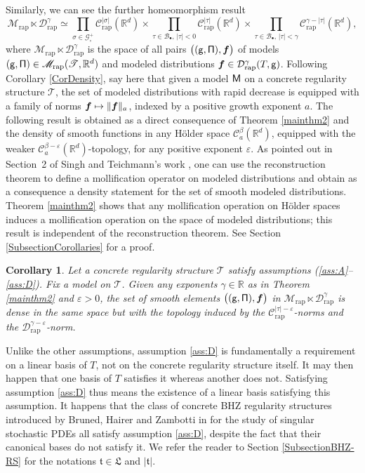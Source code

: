 \documentclass[10pt]{amsart}
\newcommand\mto{\mathchoice{\longmapsto}{\mapsto}{\mapsto}{\mapsto}}
\newcommand{\sbullet}{{\scriptscriptstyle\bullet}}
\theoremstyle{plain}
\newtheorem{cor}[thm]{Corollary}
\theoremstyle{definition}
\newcommand{\bsf}{\boldsymbol{f}}
\newcommand{\rap}{\mathrm{rap}}
\newcommand{\scrM}{\mathscr{M}}
\newcommand{\scrT}{\mathscr{T}}
\let\epsilon\varepsilon
\newcommand{\bbR}{\mathbb{R}}
\newcommand{\mcB}{\mathcal{B}}
\newcommand{\mcC}{\mathcal{C}}
\newcommand{\mcD}{\mathcal{D}}
\newcommand{\mcG}{\mathcal{G}}
\begin{document}
Similarly, we can see the further homeomorphism result
\[
\scrM_{\rap}\ltimes\mcD_{\rap}^\gamma \simeq
\prod_{\sigma\in\mcG_\circ^+} \mcC_\rap^{|\sigma|}(\bbR^d) \times \prod_{\tau\in\mcB_\sbullet,\,|\tau|<0} \mcC_\rap^{|\tau|}(\bbR^d)
\times \prod_{\tau\in\mcB_\sbullet,\, |\tau|<\gamma} \mcC_\rap^{\gamma-|\tau|}(\bbR^d),
\]
where $\scrM_{\rap}\ltimes\mcD_{\rap}^\gamma$ is the space of all pairs $\bigl(({\sf g},{\sf\Pi}),\bsf\bigr)$ of models $({\sf g},{\sf\Pi})\in\scrM_{\rap}(\scrT,\bbR^d)$ and modeled distributions $\bsf\in\mcD_{\rap}^\gamma(T,{\sf g})$. Following Corollary \ref{CorDensity}, say here that given a model $\sf M$ on a concrete regularity structure $\mathscr{T}$, the set of modeled distributions with rapid decrease is equipped with a family of norms $\bsf \mto \|\bsf\|_a$, indexed by a positive growth exponent $a$. The following result is obtained as a direct consequence of Theorem \ref{mainthm2} and the density of smooth functions in any Hölder space $\mcC_a^\beta(\bbR^d)$, equipped with the weaker $\mcC_a^{\beta-\epsilon}(\bbR^d)$-topology, for any positive exponent $\epsilon$. As pointed out in Section~2 of Singh and Teichmann's work \cite{SinghTeichmann}, one can use the reconstruction theorem to define a mollification operator on modeled distributions and obtain as a consequence a density statement for the set of smooth modeled distributions. Theorem \ref{mainthm2} shows that any mollification operation on Hölder spaces induces a mollification operation on the space of modeled distributions; this result is independent of the reconstruction theorem. See Section \ref{SubsectionCorollaries} for a proof.

\begin{cor} \label{CorDensitySmoothModelled}
Let a concrete regularity structure $\scrT$ satisfy assumptions \textup{(\ref{ass:A}--\ref{ass:D})}. Fix a model on $\mathscr{T}$. Given any exponents $\gamma\in\bbR$ as in Theorem \ref{mainthm2} and $\epsilon>0$, the set of smooth elements $\bigl(({\sf g},{\sf\Pi}),\bsf\bigr)$ in $\scrM_{\rap}\ltimes\mcD_{\rap}^\gamma$ is dense in the same space but with the topology induced by the $\mcC_{\rap}^{|\tau|-\epsilon}$-norms and the $\mcD_{\rap}^{\gamma-\epsilon}$-norm.
\end{cor}

Unlike the other assumptions, assumption \eqref{ass:D} is fundamentally a requirement on a linear basis of $T$, not on the concrete regularity structure itself. It may then happen that one basis of $T$ satisfies it whereas another does not. Satisfying assumption \eqref{ass:D} thus means the existence of a linear basis satisfying this assumption. It happens that the class of concrete BHZ regularity structures introduced by Bruned, Hairer and Zambotti in \cite{BHZ} for the study of singular stochastic PDEs all satisfy assumption \eqref{ass:D}, despite the fact that their canonical bases do not satisfy it. We refer the reader to Section \ref{SubsectionBHZ-RS} for the notations $\mathfrak{t}\in\mathfrak{L}$ and $|\mathfrak{t}|$.
\end{document}
